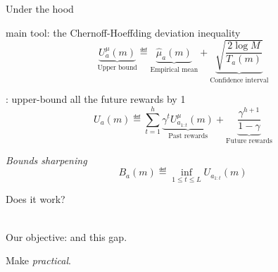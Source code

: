 \documentclass{beamer}
\begin{document}
\begin{frame}{Under the hood}
    \begin{block}{\OLOP main tool: the Chernoff-Hoeffding deviation inequality}
        \begin{equation*}
             \underbrace{U^{\mu}_a(m)}_{\text{Upper bound}} \eqdef \underbrace{\hat{\mu}_a(m)}_{\text{Empirical mean}} + \underbrace{\sqrt{\frac{2 \log M}{T_a(m)}}}_{\text{Confidence interval}}
        \end{equation*}
    \end{block}
    \pause
    
    \begin{block}{\OPD: upper-bound all the future rewards by 1}
    \begin{equation*}
    \label{eq:Ua}
        U_a(m) \eqdef \sum_{t=1}^h \underbrace{\gamma^t U^{\mu}_{a_{1:t}}(m)}_{\text{Past rewards}} + \underbrace{\frac{\gamma^{h+1}}{1-\gamma}}_{\text{Future rewards}}
    \end{equation*}
    \end{block}
    \pause
    
    \begin{block}{\emph{Bounds sharpening}}
    \begin{equation*}
    \label{eq:Ba}
        B_a(m) \eqdef \inf_{1 \leq t \leq L} U_{a_{1:t}}(m)
    \end{equation*}
    \end{block}
\end{frame}

\begin{frame}{Does it work?}
\begin{center}
     \\
    Our objective:  and  this gap.
\end{center}
\begin{flushright}
Make \OLOP \emph{practical}.
\end{flushright}
\end{frame}
\end{document}
